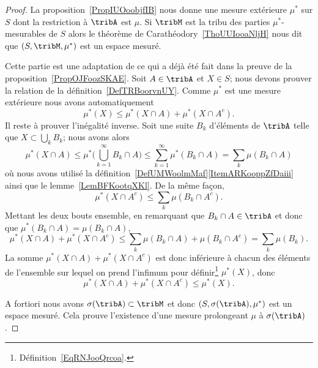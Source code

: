\begin{proof}
	La proposition~\ref{PropIUOoobjfIB} nous donne une mesure extérieure \( \mu^*\) sur \( S\) dont la restriction à \( \tribA\) est \( \mu\). Si \( \tribM\) est la tribu des parties \( \mu^*\)-mesurables de \( S\) alors le théorème de Carathéodory~\ref{ThoUUIooaNljH} nous dit que \( (S,\tribM,\mu^*)\) est un espace mesuré.
	\begin{subproof}
		\spitem[\( \tribA\subset\tribM\)]
		Cette partie est une adaptation de ce qui a déjà été fait dans la preuve de la proposition~\ref{PropOJFoozSKAE}. Soit \( A\in\tribA\) et \( X\in S\); nous devons prouver la relation de la définition~\ref{DefTRBoorvnUY}. Comme \( \mu^*\) est une mesure extérieure nous avons automatiquement
		\begin{equation}
			\mu^*(X)\leq \mu^*(X\cap A)+\mu^*(X\cap A^c).
		\end{equation}
		Il reste à prouver l'inégalité inverse. Soit une suite \( B_k\) d'éléments de \( \tribA\) telle que \( X\subset\bigcup_kB_k\); nous avons alors
		\begin{equation}
			\mu^*(X\cap A)\leq \mu^*\big( \bigcup_{k=1}^{\infty}B_k\cap A \big)\leq \sum_{k=1}^{\infty}\mu^*(B_k\cap A)=\sum_k\mu(B_k\cap A)
		\end{equation}
		où nous avons utilisé la définition~\ref{DefUMWoolmMaf}\ref{ItemARKooppZfDaiii} ainsi que le lemme~\ref{LemBFKootqXKl}. De la même façon,
		\begin{equation}
			\mu^*(X\cap A^c)\leq \sum_k\mu(B_k\cap A^c).
		\end{equation}
		Mettant les deux bouts ensemble, en remarquant que \( B_k\cap A\in\tribA\) et donc que \( \mu^*(B_k\cap A)=\mu(B_k\cap A)\),
		\begin{equation}
			\mu^*(X\cap A)+\mu^*(X\cap A^c)\leq \sum_k\mu(B_k\cap A)+\mu(B_k\cap A^c)=\sum_k\mu(B_k).
		\end{equation}
		La somme \( \mu^*(X\cap A)+\mu^*(X\cap A^c)\) est donc inférieure à chacun des éléments de l'ensemble sur lequel on prend l'infimum pour définir\footnote{Définition~\ref{EqRNJooQrcoa}.} \( \mu^*(X)\), donc
		\begin{equation}
			\mu^*(X\cap A)+\mu^*(X\cap A^c)\leq \mu^*(X).
		\end{equation}
	\end{subproof}

	A fortiori nous avons \( \sigma(\tribA)\subset\tribM\) et donc \( (S,\sigma(\tribA),\mu^*)\) est un espace mesuré. Cela prouve l'existence d'une mesure prolongeant \( \mu\) à \( \sigma(\tribA)\).


\end{proof}
